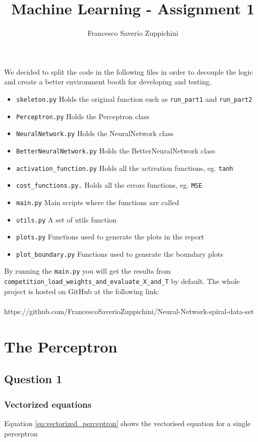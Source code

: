 \documentclass[11pt]{article}
\author{Francesco Saverio Zuppichini}
\title{Machine Learning - Assignment 1}
\begin{document}
\maketitle

We decided to split the code in the following files in order to decouple the logic and create a better environment booth for developing and testing.
\begin{itemize}
	\item \texttt{skeleton.py} Holds the original function such as \texttt{run\_part1} and \texttt{run\_part2}
	\item \texttt{Perceptron.py} Holds the Perceptron class
	\item \texttt{NeuralNetwork.py} Holds the NeuralNetwork class
	\item \texttt{BetterNeuralNetwork.py} Holds the BetterNeuralNetwork class
	\item \texttt{activation\_function.py} Holds all the activation functions, eg. \texttt{tanh}
	\item \texttt{cost\_functions.py.} Holds all the errors functions, eg. \texttt{MSE}
	\item \texttt{main.py} Main scripts where the functions are called
	\item \texttt{utils.py} A set of utils function 
	\item \texttt{plots.py} Functions used to generate the plots in the report
	\item \texttt{plot\_boundary.py} Functions used to generate the boundary plots
\end{itemize}
By running the \texttt{main.py} you will get the results from \texttt{competition\_load\_weights\_and\_evaluate\_X\_and\_T} by default. The whole project is hosted on GitHub at the following link:
\\
\\
https://github.com/FrancescoSaverioZuppichini/Neural-Network-spiral-data-set
\section{The Perceptron}
\subsection{Question 1}
\subsubsection{Vectorized equations}
Equation \ref{eq:vectorized_perceptron} shows the vectorised equation for a single perceptron
\end{document}
